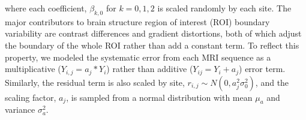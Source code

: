 where  each coefficient,
$\beta_{k,0}$ for  $k=0,1,2$ is scaled randomly by each site. The major contributors to brain structure region of interest (ROI) boundary variability are contrast differences and gradient distortions, both of which adjust the boundary of the whole ROI rather than add a constant term. To reflect this property, we modeled the systematic error from each MRI sequence as a multiplicative ($Y_{i,j} = a_j*Y_i$) rather than additive ($Y_{ij} = Y_i + a_j$) error term. Similarly, the residual term is also scaled by site, $r_{i,j} \sim N(0,a_j^2\sigma_0^2)$, and the scaling factor, $a_j$, is sampled from a normal distribution with mean $\mu_a$ and variance $\sigma_{a}^2$.